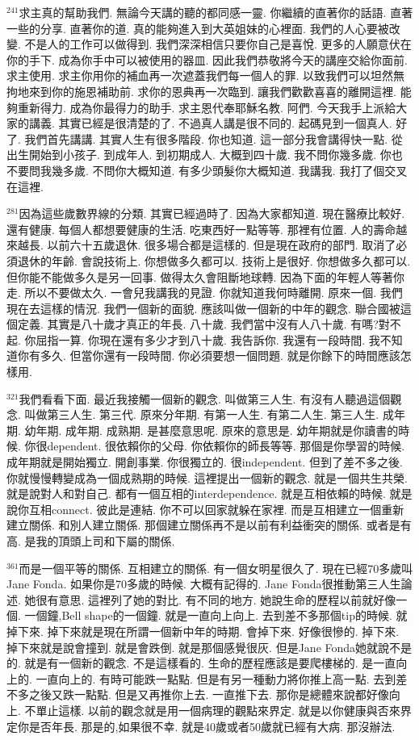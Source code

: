 \documentclass{book}
\begin{document}
$^{241}$求主真的幫助我們.
無論今天講的聽的都同感一靈.
你繼續的直著你的話語.
直著一些的分享.
直著你的道.
真的能夠進入到大英姐妹的心裡面.
我們的人心要被改變.
不是人的工作可以做得到.
我們深深相信只要你自己是喜悅.
更多的人願意伏在你的手下.
成為你手中可以被使用的器皿.
因此我們恭敬將今天的講座交給你面前.
求主使用.
求主你用你的補血再一次遮蓋我們每一個人的罪.
以致我們可以坦然無拘地來到你的施恩補助前.
求你的恩典再一次臨到.
讓我們歡歡喜喜的離開這裡.
能夠重新得力.
成為你最得力的助手.
求主恩代奉耶穌名教.
阿們.
今天我手上派給大家的講義.
其實已經是很清楚的了.
不過真人講是很不同的.
起碼見到一個真人.
好了.
我們首先講講.
其實人生有很多階段.
你也知道.
這一部分我會講得快一點.
從出生開始到小孩子.
到成年人.
到初期成人.
大概到四十歲.
我不問你幾多歲.
你也不要問我幾多歲.
不問你大概知道.
有多少頭髮你大概知道.
我講我.
我打了個交叉在這裡.

$^{281}$因為這些歲數界線的分類.
其實已經過時了.
因為大家都知道.
現在醫療比較好.
還有健康.
每個人都想要健康的生活.
吃東西好一點等等.
那裡有位置.
人的壽命越來越長.
以前六十五歲退休.
很多場合都是這樣的.
但是現在政府的部門.
取消了必須退休的年齡.
會說技術上.
你想做多久都可以.
技術上是很好.
你想做多久都可以.
但你能不能做多久是另一回事.
做得太久會阻斷地球轉.
因為下面的年輕人等著你走.
所以不要做太久.
一會兒我講我的見證.
你就知道我何時離開.
原來一個.
我們現在去這樣的情況.
我們一個新的面貌.
應該叫做一個新的中年的觀念.
聯合國被這個定義.
其實是八十歲才真正的年長.
八十歲.
我們當中沒有人八十歲.
有嗎?對不起.
你屈指一算.
你現在還有多少才到八十歲.
我告訴你.
我還有一段時間.
我不知道你有多久.
但當你還有一段時間.
你必須要想一個問題.
就是你餘下的時間應該怎樣用.

$^{321}$我們看看下面.
最近我接觸一個新的觀念.
叫做第三人生.
有沒有人聽過這個觀念.
叫做第三人生.
第三代.
原來分年期.
有第一人生.
有第二人生.
第三人生.
成年期.
幼年期.
成年期.
成熟期.
是甚麼意思呢.
原來的意思是.
幼年期就是你讀書的時候.
你很dependent.
很依賴你的父母.
你依賴你的師長等等.
那個是你學習的時候.
成年期就是開始獨立.
開創事業.
你很獨立的.
很independent.
但到了差不多之後.
你就慢慢轉變成為一個成熟期的時候.
這裡提出一個新的觀念.
就是一個共生共榮.
就是說對人和對自己.
都有一個互相的interdependence.
就是互相依賴的時候.
就是說你互相connect.
彼此是連結.
你不可以回家就躲在家裡.
而是互相建立一個重新建立關係.
和別人建立關係.
那個建立關係再不是以前有利益衝突的關係.
或者是有高.
是我的頂頭上司和下屬的關係.

$^{361}$而是一個平等的關係.
互相建立的關係.
有一個女明星很久了.
現在已經70多歲叫Jane Fonda.
如果你是70多歲的時候.
大概有記得的.
Jane Fonda很推動第三人生論述.
她很有意思.
這裡列了她的對比.
有不同的地方.
她說生命的歷程以前就好像一個.
一個鐘,Bell shape的一個鐘.
就是一直向上向上.
去到差不多那個tip的時候.
就掉下來.
掉下來就是現在所謂一個新中年的時期.
會掉下來.
好像很慘的.
掉下來.
掉下來就是說會撞到.
就是會跌倒.
就是那個感覺很灰.
但是Jane Fonda她就說不是的.
就是有一個新的觀念.
不是這樣看的.
生命的歷程應該是要爬樓梯的.
是一直向上的.
一直向上的.
有時可能跌一點點.
但是有另一種動力將你推上高一點.
去到差不多之後又跌一點點.
但是又再推你上去.
一直推下去.
那你是總體來說都好像向上.
不單止這樣.
以前的觀念就是用一個病理的觀點來界定.
就是以你健康與否來界定你是否年長.
那是的,如果很不幸.
就是40歲或者50歲就已經有大病.
那沒辦法.
\end{document}
